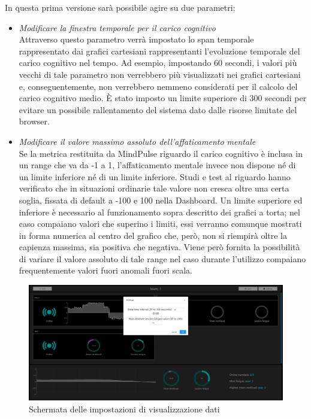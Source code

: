 \vspace{20mm}
In questa prima versione sarà possibile agire su due parametri:
\begin{itemize}
    \item \emph{Modificare la finestra temporale per il carico cognitivo}\\
    {Attraverso questo parametro verrà impostato lo span temporale rappresentato dai grafici cartesiani rappresentanti l'evoluzione temporale del carico cognitivo nel tempo.\newline
    Ad esempio, impostando 60 secondi, i valori più vecchi di tale parametro non verrebbero più visualizzati nei grafici cartesiani e, conseguentemente, non verrebbero nemmeno considerati per il calcolo del carico cognitivo medio.\newline
    È stato imposto un limite superiore di 300 secondi per evitare un possibile rallentamento del sistema dato dalle risorse limitate del browser.}
    \item \emph{Modificare il valore massimo assoluto dell'affaticamento mentale}\\
    {Se la metrica restituita da MindPulse riguardo il carico cognitivo è inclusa in un range che va da -1 a 1, l'affaticamento mentale invece non dispone né di un limite inferiore né di un limite inferiore.\newline
    Studi e test al riguardo hanno verificato che in situazioni ordinarie tale valore non cresca oltre una certa soglia, fissata di default a -100 e 100 nella Dashboard.\newline
    Un limite superiore ed inferiore è necessario al funzionamento sopra descritto dei grafici a torta; nel caso compaiano valori che superino i limiti, essi verranno comunque mostrati in forma numerica al centro del grafico che, però, non si riempirà oltre la capienza massima, sia positiva che negativa.\newline
    Viene però fornita la possibilità di variare il valore assoluto di tale range nel caso durante l'utilizzo compaiano frequentemente valori fuori anomali fuori scala.}
\end{itemize}
\vspace{2mm}
\begin{figure}[H]
    \centering
    \includegraphics[width=1.0\textwidth]{img/dashboard_team_settings_screenshot.png}
    \caption{Schermata delle impostazioni di visualizzazione dati}
\end{figure}